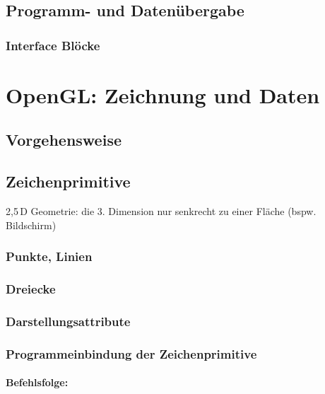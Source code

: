 \section{Programm- und Datenübergabe}
\subsection{Interface Blöcke}

\chapter{OpenGL: Zeichnung und Daten}

\section{Vorgehensweise}

\section{Zeichenprimitive}

2,5\,D Geometrie: die 3. Dimension nur senkrecht zu einer Fläche (bspw. Bildschirm)

\subsection{Punkte, Linien}

\subsection{Dreiecke}

\subsection{Darstellungsattribute}

\subsection{Programmeinbindung der Zeichenprimitive}
\subsubsection*{Befehlsfolge:}

